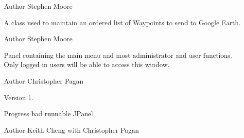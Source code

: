 \begin{DoxyAuthor}{Author}
Stephen Moore
\end{DoxyAuthor}
A class used to maintain an ordered list of Waypoints to send to Google Earth.

\begin{DoxyAuthor}{Author}
Stephen Moore
\end{DoxyAuthor}
Panel containing the main menu and most administrator and user functions. Only logged in users will be able to access this window.

\begin{DoxyAuthor}{Author}
Christopher Pagan 
\end{DoxyAuthor}
\begin{DoxyVersion}{Version}
1.
\end{DoxyVersion}
Progress bad runnable J\-Panel

\begin{DoxyAuthor}{Author}
Keith Cheng with Christopher Pagan 
\end{DoxyAuthor}
